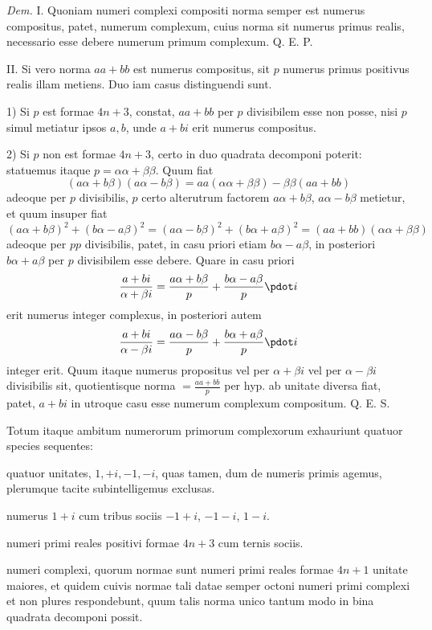 \emph{Dem.} I. Quoniam numeri complexi compositi norma semper est numerus compositus, patet, numerum complexum, cuius norma sit numerus primus realis, necessario esse debere numerum primum complexum. Q. E. P.

II. Si vero norma $aa+bb$ est numerus compositus, sit $p$ numerus primus positivus realis illam metiens. Duo iam casus distinguendi sunt.

1) Si $p$ est formae $4n+3$, constat, $aa+bb$ per $p$ divisibilem esse non posse, nisi $p$ simul metiatur ipsos $a,b$, unde $a+bi$ erit numerus compositus.

2) Si $p$ non est formae $4n+3$, certo in duo quadrata decomponi poterit: statuemus itaque $p=\alpha\alpha+\beta\beta$. Quum fiat
\[
(a\alpha+b\beta)(a\alpha-b\beta)=aa(\alpha\alpha+\beta\beta)-\beta\beta(aa+bb)
\]
adeoque per $p$ divisibilis, $p$ certo alterutrum factorem $a\alpha+b\beta$, $a\alpha-b\beta$ metietur, et quum insuper fiat
\[
(a\alpha+b\beta)^2+(b\alpha-a\beta)^2=(a\alpha-b\beta)^2+(b\alpha+a\beta)^2=(aa+bb)(\alpha\alpha+\beta\beta)
\]
adeoque per $pp$ divisibilis, patet, in casu priori etiam $b\alpha-a\beta$, in posteriori $b\alpha+a\beta$ per $p$ divisibilem esse debere. Quare in casu priori
\[
\frac{a+bi}{\alpha+\beta i}=\frac{a\alpha+b\beta}{p}+\frac{b\alpha-a\beta}{p}\pdot i
\]
erit numerus integer complexus, in posteriori autem
\[
\frac{a+bi}{\alpha-\beta i}=\frac{a\alpha-b\beta}{p}+\frac{b\alpha+a\beta}{p}\pdot i
\]
integer erit. Quum itaque numerus propositus vel per $\alpha+\beta i$ vel per $\alpha-\beta i$ divisibilis sit, quotientisque norma $=\frac{aa+bb}{p}$ per hyp. ab unitate diversa fiat, patet, $a+bi$ in utroque casu esse numerum complexum compositum. Q. E. S.

%
Totum itaque ambitum numerorum primorum complexorum exhauriunt quatuor species sequentes:

\begin{list}{}{\setlength{\leftmargin}{1.7em}\setlength{\labelwidth}{1.5em}\setlength{\labelsep}{.2em}}
\item[1)] quatuor unitates, $1,+i,-1,-i$, quas tamen, dum de numeris primis agemus, plerumque tacite subintelligemus exclusas.
\item[2)] numerus $1+i$ cum tribus sociis $-1+i$, $-1-i$, $1-i$.
\item[3)] numeri primi reales positivi formae $4n+3$ cum ternis sociis.
\item[4)] numeri complexi, quorum normae sunt numeri primi reales formae $4n+1$ unitate maiores, et quidem cuivis normae tali datae semper octoni numeri primi complexi et non plures respondebunt, quum talis norma unico tantum modo in bina quadrata decomponi possit.
\end{list}

